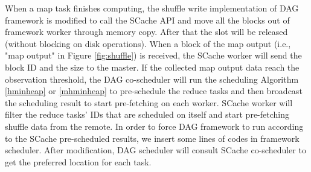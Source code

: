 When a map task finishes computing, the shuffle write implementation of DAG framework is modified to call the SCache API and move all the blocks out of {\color{blue}framework worker} through memory copy. 
After that the slot will be released (without blocking on disk operations).
When a block of the map output (i.e., "map output" in Figure \ref{fig:shuffle}) is received, the SCache worker will send the block ID and the size to the master.
If the collected map output data reach the observation threshold, the DAG co-scheduler will run the scheduling Algorithm \ref{hminheap} or \ref{mhminheap} to pre-schedule the reduce tasks and then broadcast the scheduling result to start pre-fetching on each worker.
SCache worker will filter the reduce tasks' IDs that are scheduled on itself and start pre-fetching shuffle data from the remote. 
{\color{blue}
In order to force DAG framework to run according to the SCache pre-scheduled results, we insert some lines of codes in framework scheduler.
After modification, DAG scheduler will consult SCache co-scheduler to get the preferred location for each task.
}

